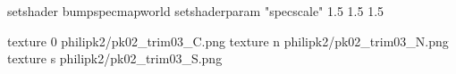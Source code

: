 setshader bumpspecmapworld
setshaderparam "specscale" 1.5 1.5 1.5

texture 0 philipk2/pk02_trim03_C.png
texture n philipk2/pk02_trim03_N.png
texture s philipk2/pk02_trim03_S.png

